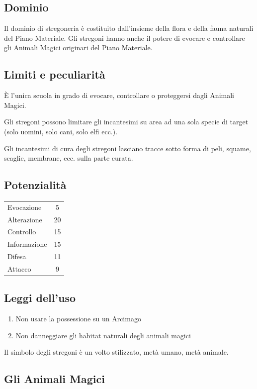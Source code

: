 \subsection{Dominio} 

Il dominio di stregoneria \`e costituito dall'insieme della flora e
della fauna naturali del Piano Materiale.  Gli stregoni hanno anche il
potere di evocare e controllare gli Animali Magici originari del Piano
Materiale.


\subsection{Limiti e peculiarit\`a}

\`E l'unica scuola in grado di evocare, controllare o
proteggersi dagli Animali Magici. 

Gli stregoni possono limitare gli incantesimi su area ad una sola
specie di target (solo uomini, solo cani, solo elfi ecc.).

Gli incantesimi di cura degli stregoni lasciano tracce sotto forma di
peli, squame, scaglie, membrane, ecc. sulla parte curata.

\subsection{Potenzialit\`a}
\begin{tabular}{lc}
  Evocazione& 5\\
  Alterazione& 20 \\
  Controllo& 15\\
  Informazione& 15 \\
  Difesa& 11\\
  Attacco& 9\\
\end{tabular}

\subsection{Leggi dell'uso}
\begin{enumerate}\itemsep -6pt
\item Non usare la possessione su un Arcimago
\item Non danneggiare gli habitat naturali degli animali magici 
\end{enumerate}

Il simbolo degli stregoni \`e un volto stilizzato, met\`a umano,
met\`a animale.

\iffullversion
\subsection{Gli Animali Magici}

